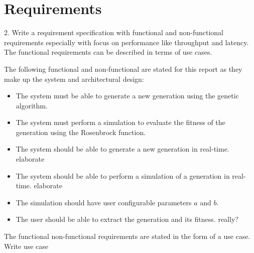 \section{Requirements}\label{sec:req}

\begin{framed}
2. Write a requirement specification with functional and non-functional requirements especially with focus on performance like throughput and latency. The functional requirements can be described in terms of use cases.
\end{framed}

The following functional and non-functional are stated for this report as they make up the system and architectural design:

\begin{itemize}
\item The system must be able to generate a new generation using the genetic algorithm.
\item The system must perform a simulation to evaluate the fitness of the generation using the Rosenbrock function.
\item The system should be able to generate a new generation in real-time. {\color{red} elaborate}
\item The system should be able to perform a simulation of a generation in real-time. {\color{red} elaborate}
\item The simulation should have user configurable parameters $a$ and $b$.
\item The user should be able to extract the generation and its fitness. {\color{red} really?}
\end{itemize}

The functional non-functional requirements are stated in the form of a use case.
 {\color{red} Write use case}